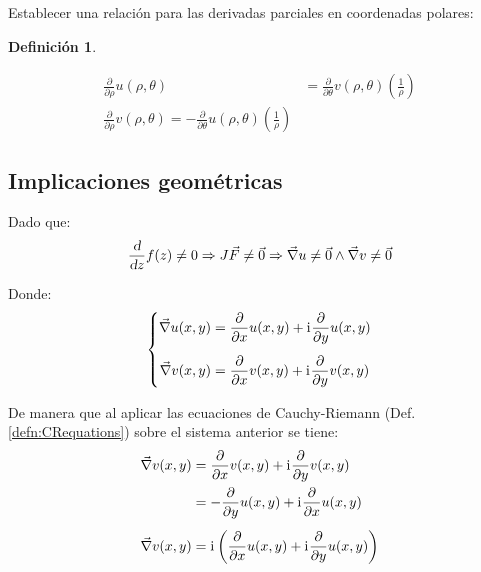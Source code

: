 \documentclass[a5paper,12pt,twoside]{book}
\newtheorem{defn}{{Definición}}[chapter]
\begin{document}
Establecer una relación para las derivadas parciales en coordenadas polares:

\begin{mdframed}[style=MyFrame1]
    \begin{defn}
        \label{defn:CRpolarEquations}
    \end{defn}
    \begin{align*}
        \frac{\partial}{\partial \rho} u(\rho,\theta) &= \frac{\partial}{\partial \theta}  v(\rho,\theta) \left( \frac{1}{\rho} \right)
        \\[1em]
        \frac{\partial}{\partial \rho} v(\rho,\theta) = - \frac{\partial}{\partial \theta} u(\rho,\theta) \left( \frac{1}{\rho} \right)
    \end{align*}
\end{mdframed}


\subsection{Implicaciones geométricas}

Dado que:
\begin{equation*}
    \frac{\textsl{d}}{\textsl{d} z} f(z) \neq 0 \Rightarrow  J \Vec{F} \neq \Vec{0} \Rightarrow \Vec{\nabla} u \neq \Vec{0} \land \Vec{\nabla} v \neq \Vec{0}
\end{equation*}

Donde:
\begin{equation*}
    \left\{
    \begin{aligned}
        \Vec{\nabla} u(x,y) &= \frac{\partial}{\partial x} u(x,y) + \mathrm{i}\mkern1mu \frac{\partial}{\partial y} u(x,y)
        \\[1ex]
        \Vec{\nabla} v(x,y) &= \frac{\partial}{\partial x} v(x,y) + \mathrm{i}\mkern1mu \frac{\partial}{\partial y} v(x,y)
    \end{aligned}
    \right.
\end{equation*}

De manera que al aplicar las ecuaciones de Cauchy-Riemann (Def. \ref{defn:CRequations}) sobre el sistema anterior se tiene:
\begin{align*}
    \Vec{\nabla} v(x,y) &= \frac{\partial}{\partial x} v(x,y) + \mathrm{i}\mkern1mu \frac{\partial}{\partial y} v(x,y)
    \\
    &= - \frac{\partial}{\partial y} u(x,y) + \mathrm{i}\mkern1mu \frac{\partial}{\partial x} u(x,y)
    \\[1ex]
    \Vec{\nabla} v(x,y) &= \mathrm{i}\mkern1mu \left( \frac{\partial}{\partial x} u(x,y) + \mathrm{i}\mkern1mu \frac{\partial}{\partial y} u(x,y) \right)
\end{align*}
\end{document}
